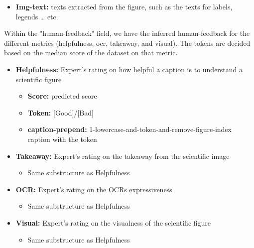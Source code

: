 \documentclass[11pt]{article}
\begin{document}
\begin{itemize}
  \begin{itemize}
  \item
    \textbf{2-1-basic-num:} caption after replacing the number
     \begin{itemize}
      \item Same substructure as 0-originally-extracted
  \end{itemize}
  \item
    \textbf{2-2-advanced-euqation-bracket:} caption after replacing the
    equations and contents in the bracket
     \begin{itemize}
      \item Same substructure as 0-originally-extracted
  \end{itemize}
  \end{itemize}
\item
  \textbf{Img-text:} texts extracted from the figure, such as the texts
  for labels, legends \ldots{} etc.
\end{itemize}

Within the "human-feedback" field, we have the inferred human-feedback for the different metrics (helpfulness, ocr, takeaway, and visual). The tokens are decided based on the median score of the dataset on that metric.

\begin{itemize}
    \item \textbf{Helpfulness:} Expert's rating on how helpful a caption is to understand a scientific figure
    \begin{itemize}
        \item \textbf{Score:} predicted score
        \item \textbf{Token:} {[}Good{]}/{[}Bad{]} 
        \item \textbf{caption-prepend:} 1-lowercase-and-token-and-remove-figure-index caption with the token
    \end{itemize}
    \item \textbf{Takeaway:} Expert's rating on the takeaway from the scientific image
    \begin{itemize}
        \item Same substructure as Helpfulness
    \end{itemize}
    \item \textbf{OCR:} Expert's rating on the OCRs expressiveness
    \begin{itemize}
        \item Same substructure as Helpfulness
    \end{itemize}
    \item \textbf{Visual:} Expert's rating on the visualness of the
scientific figure
    \begin{itemize}
        \item Same substructure as Helpfulness
    \end{itemize}
\end{itemize}
\end{document}
